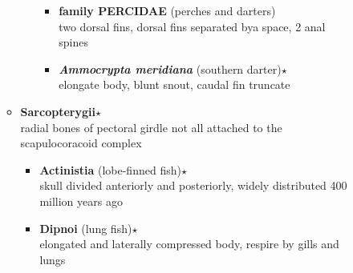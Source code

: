 \documentclass[a4paper,12pt]{article}
\begin{document}
\begin{description}
\begin{itemize}
\begin{itemize}
\begin{itemize}
\begin{itemize}
        \item{\textbf{family PERCIDAE} (perches and darters)} \\ two dorsal fins, dorsal fins separated bya  space, 2 anal spines
        \item{\textbf{\textit{   Ammocrypta meridiana}} (southern darter)$\star$} \\ elongate body, blunt snout, caudal fin truncate
      \end{itemize}
    \end{itemize}
    \item{\textbf{Sarcopterygii}$\star$} \\ radial bones of pectoral girdle not all attached to the scapulocoracoid complex
    \begin{itemize}
      \item{\textbf{Actinistia} (lobe-finned fish)$\star$} \\ skull divided anteriorly and posteriorly, widely distributed 400 million years ago
      \item{\textbf{Dipnoi} (lung fish)$\star$} \\ elongated and laterally compressed body, respire by gills and lungs
    \end{itemize}
  \end{itemize}
\end{itemize}
\end{description}
\end{document}
